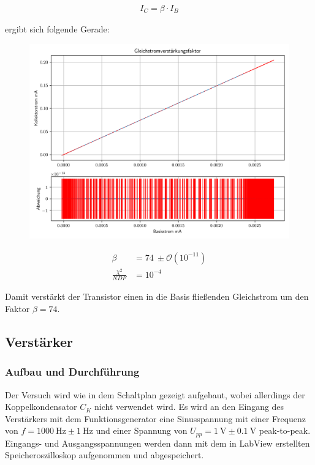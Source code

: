 \documentclass[12pt,twoside,a4paper]{scrartcl}
\begin{document}
        \begin{align*}
            I_C = \beta \cdot I_B
        \end{align*}

        ergibt sich folgende Gerade:

        \begin{figure}[H]
            \begin{minipage}{0.69 \textwidth}
                \includegraphics[width = 0.8 \textwidth]{Plots/Transistor/gsvf}
            \end{minipage}
            \begin{minipage}{0.29 \textwidth}
                \begin{align*}
                    \beta &= \SI{74}{} \pm \mathcal{O}(10^{-11}) \\
                    \frac{\chi^2}{NDF} &= 10^{-4}
                \end{align*}
            \end{minipage}
        \end{figure}

				Damit verstärkt der Transistor einen in die Basis fließenden Gleichstrom um den Faktor $ \beta = 74$.

    \subsection{Verstärker}

			\subsubsection{Aufbau und Durchführung}

			Der Versuch wird wie in dem Schaltplan gezeigt aufgebaut, wobei allerdings der Koppelkondensator $C_K$ nicht verwendet wird.
			Es wird an den Eingang des Verstärkers mit dem Funktionsgenerator eine Sinusspannung mit einer Frequenz von $f = \SI{1000}{\hertz} \pm \SI{1}{\hertz}$
		  und einer Spannung von $U_{pp} = \SI{1}{\volt} \pm \SI{0.1}{\volt}$ peak-to-peak.
			Eingangs- und Ausgangsspannungen werden dann mit dem in LabView erstellten Speicheroszilloskop aufgenommen und abgespeichert.
\end{document}
